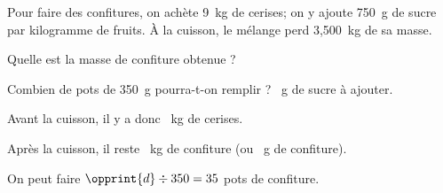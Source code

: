 Pour faire des confitures, on achète 9~kg de cerises; on y ajoute
750~g de sucre par kilogramme de fruits. \`A la cuisson, le mélange
perd 3,500~kg de sa masse.\par Quelle est la masse de confiture
obtenue ?\par Combien de pots de 350~g pourra-t-on remplir ?
~g de sucre à ajouter.
\par Avant la cuisson, il y a donc ~kg de cerises.
\par Après la cuisson, il reste ~kg de confiture (ou ~g de confiture).\par
On peut faire $\opprint{d}\div350=35$ pots de confiture.
